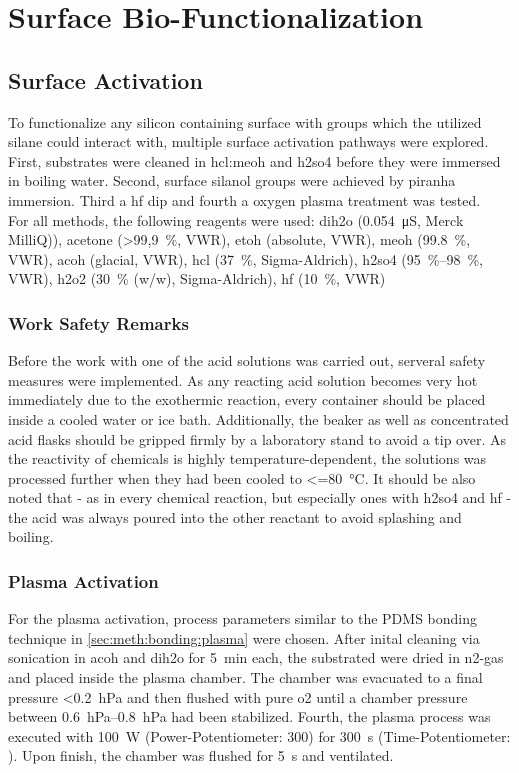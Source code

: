 \section{Surface Bio-Functionalization}
\subsection{Surface Activation}
\label{sec:meth:surfActiv}
To functionalize any silicon containing surface with  groups which the utilized silane could interact with, multiple surface activation pathways were explored. First, substrates were cleaned in \gls{hcl}:\gls{meoh} and \gls{h2so4} before they were immersed in boiling water. Second, surface silanol groups were achieved by piranha immersion. Third a \gls{hf} dip and fourth a oxygen plasma treatment was tested.\\
For all methods, the following reagents were used: \gls{dih2o} (\SI{0,054}{\micro\siemens}, Merck MilliQ)), acetone (\SI{>99,9}{\percent}, VWR), \gls{etoh} (absolute, VWR), \gls{meoh} (\SI{99.8}{\percent}, VWR), \gls{acoh} (glacial, VWR), \gls{hcl} (\SI{37}{\percent}, Sigma-Aldrich), \gls{h2so4} (\SIrange{95}{98}{\percent}, VWR), \gls{h2o2} (\SI{30}{\percent} (w/w), Sigma-Aldrich), \gls{hf} (\SI{10}{\percent}, VWR)

\subsubsection{Work Safety Remarks}
Before the work with one of the acid solutions was carried out, serveral safety measures were implemented. As any reacting acid solution becomes very hot immediately due to the exothermic reaction, every container should be placed inside a cooled water or ice bath. Additionally, the beaker as well as concentrated acid flasks should be gripped firmly by a laboratory stand to avoid a tip over. As the reactivity of chemicals is highly temperature-dependent, the solutions was processed further when they had been cooled to \SI{<=80}{\degreeCelsius}. It should be also noted that - as in every chemical reaction, but especially ones with \gls{h2so4} and \gls{hf} - the acid was always poured into the other reactant to avoid splashing and boiling.

\subsubsection{Plasma Activation}
For the plasma activation, process parameters similar to the PDMS bonding technique in \ref{sec:meth:bonding:plasma} were chosen. After inital cleaning via sonication in \gls{acoh} and \gls{dih2o} for \SI{5}{\minute} each, the substrated were dried in \gls{n2}-gas and placed inside the plasma chamber. The chamber was evacuated to a final pressure <\SI{0.2}{\hecto\pascal} and then flushed with pure \gls{o2} until a chamber pressure between \SIrange{0.6}{0.8}{\hecto\pascal} had been stabilized. Fourth, the plasma process was executed with \SI{100}{\watt} (Power-Potentiometer: 300) for \SI{300}{\second} (Time-Potentiometer: 
). Upon finish, the chamber was flushed for \SI{5}{\second} and ventilated.

